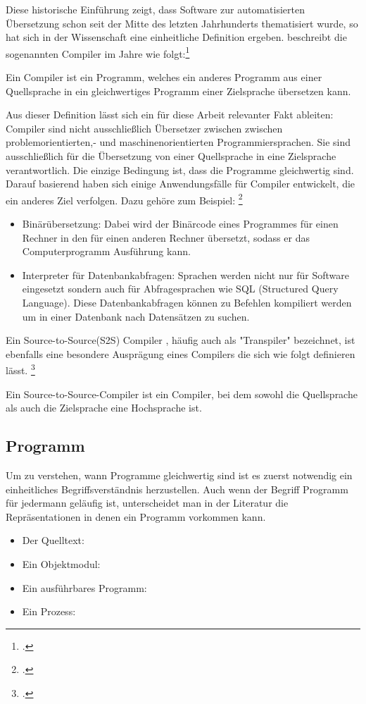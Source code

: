 Diese historische Einführung zeigt,  dass Software zur automatisierten Übersetzung schon seit der Mitte des letzten Jahrhunderts thematisiert wurde, so hat sich in der Wissenschaft eine einheitliche Definition ergeben.  \citeauthor{Ullmann2008} beschreibt die sogenannten Compiler im Jahre \citeyear{Ullmann2008} wie folgt:\footcite[Vgl.][S. 1]{Ullmann2008} 
\begin{Def}[Compiler]
Ein Compiler ist ein Programm, welches ein anderes Programm aus einer Quellsprache in ein gleichwertiges Programm einer Zielsprache übersetzen kann.
\end{Def} Aus dieser Definition lässt sich ein für diese Arbeit relevanter Fakt ableiten: Compiler sind nicht ausschließlich Übersetzer zwischen zwischen problemorientierten,- und maschinenorientierten Programmiersprachen.  Sie sind ausschließlich für die Übersetzung von einer Quellsprache in eine Zielsprache verantwortlich.  Die einzige Bedingung ist,  dass die Programme gleichwertig sind.  Darauf basierend haben sich einige Anwendungsfälle für Compiler entwickelt,  die ein anderes Ziel verfolgen. Dazu gehöre zum Beispiel: \footcite[Vgl.][S. 27]{Ullmann2008}\\
\begin{itemize}
\item Binärübersetzung: Dabei wird der Binärcode eines Programmes für einen Rechner in den für einen anderen Rechner übersetzt, sodass er das Computerprogramm Ausführung kann.
\item Interpreter für Datenbankabfragen: Sprachen werden nicht nur für Software eingesetzt sondern auch für Abfragesprachen wie SQL (Structured Query Language).  Diese Datenbankabfragen können zu Befehlen kompiliert werden um in einer Datenbank nach Datensätzen zu suchen. 
\end{itemize}

Ein Source-to-Source(S2S) Compiler , häufig auch als "Transpiler" bezeichnet, ist ebenfalls eine besondere Ausprägung eines Compilers die sich wie folgt definieren lässt.  \footcite[Vgl.][S. 1629]{IJCSIT2015}
\begin{Def}
Ein Source-to-Source-Compiler ist ein Compiler, bei dem sowohl die Quellsprache als auch die Zielsprache eine Hochsprache ist.
\end{Def}



\subsection{Programm}
Um zu verstehen, wann Programme gleichwertig sind ist es zuerst notwendig ein einheitliches Begriffsverständnis herzustellen.  Auch wenn der Begriff Programm für jedermann geläufig ist,  unterscheidet man in der Literatur die Repräsentationen in denen ein Programm vorkommen kann.
\begin{itemize}
\item Der Quelltext:
\item Ein Objektmodul:
\item Ein ausführbares Programm:
\item Ein Prozess:
\end{itemize}

